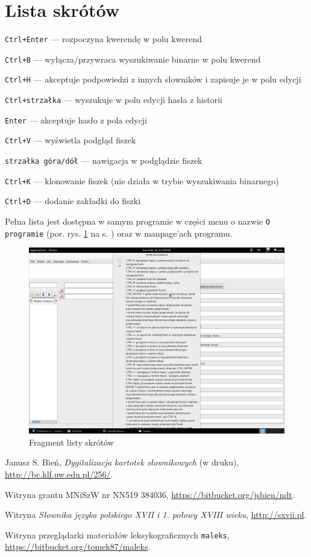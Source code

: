 \documentclass[12pt,oneside,notitlepage,titleauthor]{mwart}%
\begin{document}
\section{Lista skrótów}


\texttt{Ctrl+Enter} --- rozpoczyna kwerendę w polu kwerend

\texttt{Ctrl+B} --- wyłącza/przywraca wyszukiwanie binarne w polu kwerend

\texttt{Ctrl+H} --- akceptuje podpowiedzi z innych słowników i zapisuje je w polu edycji

\texttt{Ctrl+strzałka} --- wyszukuje w polu edycji hasła z historii

\texttt{Enter} --- akceptuje hasło z pola edycji

\texttt{Ctrl+V} --- wyświetla podgląd fiszek

\texttt{strzałka góra/dół} --- nawigacja w podglądzie fiszek

\texttt{Ctrl+K} --- klonowanie fiszek (nie działa w trybie wyszukiwania binarnego)

\texttt{Ctrl+D} --- dodanie zakładki do fiszki

Pełna lista jest dostępna w samym programie w części menu o nazwie \texttt{O programie} (por. rys. \ref{skroty} na s. \pageref{skroty}) oraz w manpage'ach programu. 

\begin{figure}[h]
\includegraphics[scale=0.3]{skroty2.png}
\caption{Fragment listy skrótów}
\label{skroty}
\end{figure}

Janusz S. Bień, \textit{Dygitalizacja kartotek słownikowych} (w druku), \url{http://bc.klf.uw.edu.pl/256/}.

Witryna grantu MNiSzW nr NN519 384036, \url{https://bitbucket.org/jsbien/ndt}.

Witryna \textit{Słownika języka polskiego XVII i 1. połowy XVIII wieku}, \url{http://sxvii.pl}.

Witryna przeglądarki materiałów leksykograficznych \texttt{maleks}, \url{https://bitbucket.org/tomek87/maleks}.
\end{document}
